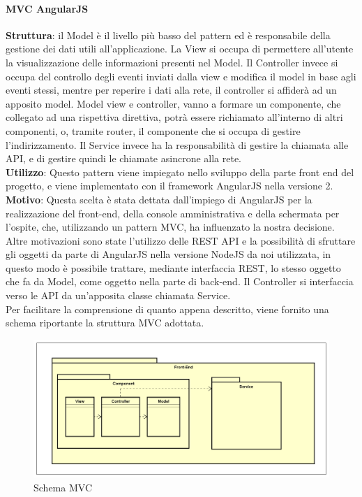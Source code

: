 \documentclass[../DefinizioneDiProdotto_v3.0.0.tex]{subfiles}
\begin{document}
\paragraph{MVC AngularJS}\mbox{}
\begin{addmargin}[1em]{2em}%
	\textbf{Struttura}: il Model è il livello più basso del pattern ed è responsabile della gestione dei dati utili all'applicazione.
	La View si occupa di permettere all'utente la visualizzazione delle informazioni presenti nel Model.
	Il Controller invece si occupa del controllo degli eventi inviati dalla view e modifica il model in base agli eventi stessi, mentre per reperire i dati alla rete, il controller si affiderà ad un apposito model.
	Model view e controller, vanno a formare un componente, che collegato ad una rispettiva direttiva, potrà essere richiamato all'interno di altri componenti, o, tramite router, il componente che si occupa di gestire l'indirizzamento.
	Il Service invece ha la responsabilità di gestire la chiamata alle API, e di gestire quindi le chiamate asincrone alla rete.\\
	\textbf{Utilizzo}: Questo pattern viene impiegato nello sviluppo della parte front end del progetto, e viene implementato con il framework AngularJS nella versione 2.\\
	\textbf{Motivo}: Questa scelta è stata dettata dall'impiego di AngularJS per la realizzazione del front-end, della console amministrativa e della schermata per l'ospite, che, utilizzando un pattern MVC, ha influenzato la nostra decisione. Altre motivazioni sono state l'utilizzo delle REST API e la possibilità di sfruttare gli oggetti da parte di AngularJS nella versione NodeJS da noi utilizzata, in questo modo è possibile trattare, mediante interfaccia REST, lo stesso oggetto che fa da Model, come oggetto nella parte di back-end. Il Controller si interfaccia verso le API da un'apposita classe chiamata Service.\\
	Per facilitare la comprensione di quanto appena descritto, viene fornito una schema riportante la struttura MVC adottata.
\end{addmargin}
\clearpage
\begin{figure}[!h]
	\centering
	\includegraphics[width=\textwidth]{Architettura/MVC.png}
	\caption{Schema MVC}
\end{figure}
\end{document}
